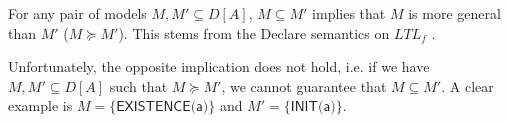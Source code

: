\begin{remark}{}\label{re:subset-generality}
For any pair of models $M, M'\subseteq D[A]$, $M\subseteq M'$ implies that $M$ is more general than $M'$ ($M\succeq M'$). This stems from the Declare semantics \cite{2008-Pesic} on $LTL_f$ \cite{DBLP:conf/ijcai/GiacomoV13}.
\end{remark} 

Unfortunately, the opposite implication does not hold, i.e. if we have $M, M'\subseteq D[A]$ such that $M\succeq M'$, we cannot guarantee that $M\subseteq M'$. A clear example is $M=\{\textsf{EXISTENCE(a)}\}$ and $M'=\{\textsf{INIT(a)}\}$.




